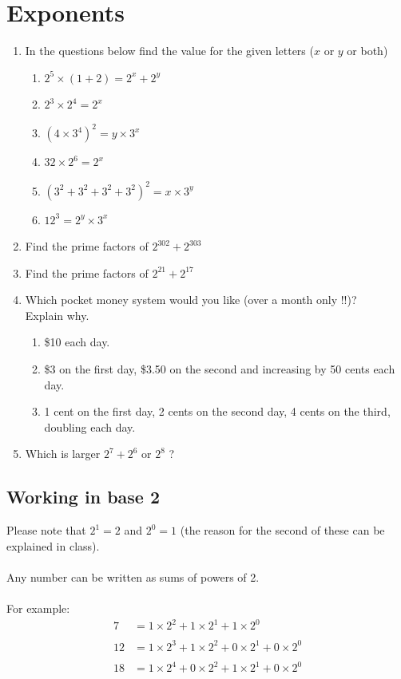\documentclass[a4paper,12pt]{article}
\begin{document}
\section{Exponents}
\begin{enumerate}
\item In the questions below find the value for the given letters ($x$ or $y$ or both)
\begin{enumerate}[label= \roman*)]
\item $2^{5}\times(1+2)=2^x+2^y$
\item $2^3 \times 2^4 = 2^x$
\item $(4 \times 3^4)^2 = y\times 3^x $
\item $32 \times 2^6 = 2^x$
\item $(3^2+3^2+3^2+3^2)^2 = x\times 3^y$
\item $12^3 = 2^y \times 3^x$
\end{enumerate}
\item Find the prime factors of $2^{302}+2^{303}$
\item Find the prime factors of $2^{21}+2^{17}$
\item Which pocket money system would you like (over a month only !!)? \\
Explain why.
\begin{enumerate}
\item \$10 each day.
\item \$3 on the first day, \$3.50 on the second and increasing by 50 cents each day.
\item 1 cent on the first day, 2 cents on the second day, 4 cents on the third, doubling each day.
\end{enumerate}
\item Which is larger $2^7+2^6$ or $2^8$ ?
\end{enumerate}
\newpage
\subsection{Working in base 2}
Please note that $2^1 = 2$ and $2^0 = 1$ (the reason for the second of these can be explained in class).\\\\
Any number can be written as sums of powers of 2.\\\\
For example:\vspace{-0.5cm}
\begin{align*}
7 &= 1\times 2^2 + 1\times 2^1 + 1 \times 2^0\\\\
12 &= 1\times 2^3 + 1 \times 2^2 + 0\times 2^1 + 0\times 2^0\\\\
18 &= 1\times 2^4 + 0\times 2^2 + 1\times 2^1 + 0 \times 2^0
\end{align*}
\end{document}
